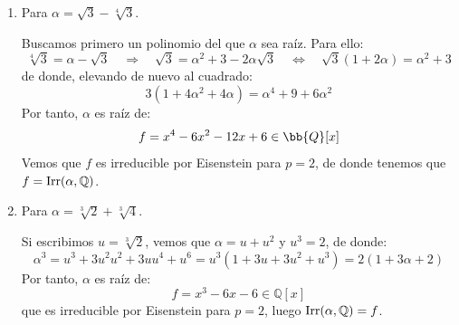 \begin{ejercicio}
\begin{enumerate}[label=\alph*)]
            En cualquier caso, tenemos que $f$ es irreducible, y por tanto es el polinomio mínimo de $\alpha$ sobre $\mathbb{Q}$.
        \item Para $\alpha = \sqrt{3}-\sqrt[4]{3}$. 

            Buscamos primero un polinomio del que $\alpha$ sea raíz. Para ello:
            \begin{equation*}
                \sqrt[4]{3} = \alpha-\sqrt{3} \quad\Longrightarrow\quad \sqrt{3} = \alpha^2 + 3 - 2\alpha \sqrt{3} \quad\Longleftrightarrow\quad \sqrt{3}(1+2\alpha) = \alpha^2 + 3
            \end{equation*}
            de donde, elevando de nuevo al cuadrado:
            \begin{equation*}
                3(1+4\alpha^2 + 4\alpha) = \alpha^4 + 9 + 6\alpha^2
            \end{equation*}
            Por tanto, $\alpha$ es raíz de:
            \begin{equation*}
                f = x^4 -6x^2 -12x +6\in \bb{Q}[x]
            \end{equation*}
            Vemos que $f$ es irreducible por Eisenstein para $p=2$, de donde tenemos que $f = \operatorname{Irr}(\alpha,\mathbb{Q})$.
        \item Para $\alpha = \sqrt[3]{2}+\sqrt[3]{4}$. 

            Si escribimos $u = \sqrt[3]{2}$, vemos que $\alpha = u+u^2$ y $u^3=2$, de donde:
            \begin{equation*}
                \alpha^3 = u^3 + 3u^2u^2 + 3uu^4 + u^6 = u^3(1+3u+3u^2 + u^3) = 2(1+3\alpha + 2)
            \end{equation*}
            Por tanto, $\alpha$ es raíz de:
            \begin{equation*}
                f = x^3-6x-6\in \mathbb{Q}[x]
            \end{equation*}
            que es irreducible por Eisenstein para $p=2$, luego $\operatorname{Irr}(\alpha,\mathbb{Q}) = f$.
    \end{enumerate}
\end{ejercicio}

